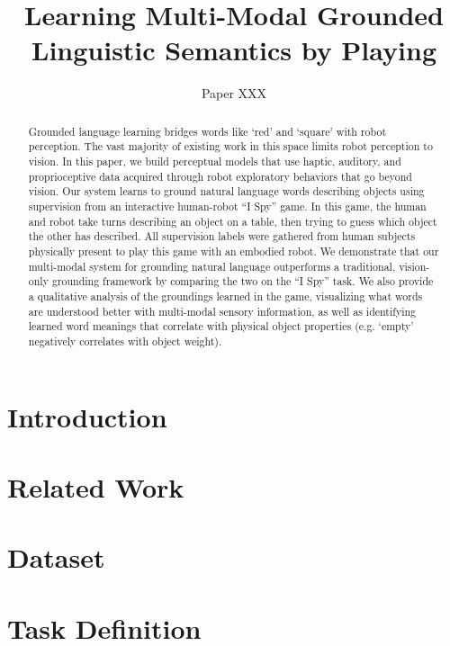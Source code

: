 \documentclass{article}
\title{Learning Multi-Modal Grounded Linguistic Semantics by Playing \ispy}
\author{Paper XXX}
\newcommand{\ispy}{``I Spy''\xspace}
\begin{document}
\maketitle

\begin{abstract}
Grounded language learning bridges words like `red' and `square' with robot perception.
The vast majority of existing work in this space limits robot perception to vision.
In this paper, we build perceptual models that use haptic, auditory, and proprioceptive data acquired through robot exploratory behaviors that go beyond vision.
Our system learns to ground natural language words describing objects using supervision from an interactive human-robot \ispy game.
In this game, the human and robot take turns describing an object on a table, then trying to guess which object the other has described.
All supervision labels were gathered from human subjects physically present to play this game with an embodied robot.
We demonstrate that our multi-modal system for grounding natural language outperforms a traditional, vision-only grounding framework by comparing the two on the \ispy task.
We also provide a qualitative analysis of the groundings learned in the game, visualizing what words are understood better with multi-modal sensory information, as well as identifying learned word meanings that correlate with physical object properties (e.g. `empty' negatively correlates with object weight).
\end{abstract}

\section{Introduction}
\label{sec:introduction}
	

\section{Related Work}
\label{sec:relatedwork}
	

\section{Dataset}
\label{sec:dataset}
	

\section{Task Definition}
\label{sec:taskdefinition}
	
\end{document}
